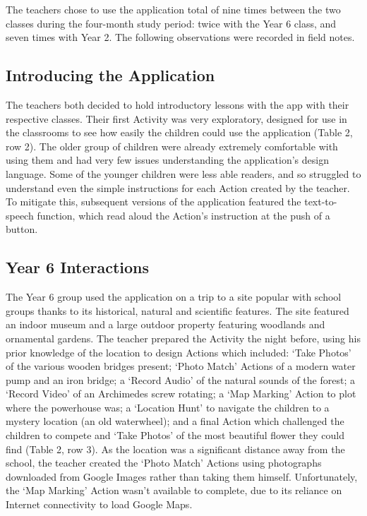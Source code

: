 The teachers chose to use the application total of nine times between the two classes during the four-month study period: twice with the Year 6 class, and seven times with Year 2. The following observations were recorded in field notes.

\subsection{Introducing the Application}

The teachers both decided to hold introductory lessons with the app with their respective classes. Their first Activity was very exploratory, designed for use in the classrooms to see how easily the children could use the application (Table 2, row 2). The older group of children were already extremely comfortable with using them and had very few issues understanding the application’s design language. Some of the younger children were less able readers, and so struggled to understand even the simple instructions for each Action created by the teacher. To mitigate this, subsequent versions of the application featured the text-to-speech function, which read aloud the Action’s instruction at the push of a button.

\subsection{Year 6 Interactions}

The Year 6 group used the application on a trip to a site popular with school groups thanks to its historical, natural and scientific features. The site featured an indoor museum and a large outdoor property featuring woodlands and ornamental gardens. The teacher prepared the Activity the night before, using his prior knowledge of the location to design Actions which included: ‘Take Photos’ of the various wooden bridges present; ‘Photo Match’ Actions of a modern water pump and an iron bridge; a ‘Record Audio’ of the natural sounds of the forest; a ‘Record Video’ of an Archimedes screw rotating; a ‘Map Marking’ Action to plot where the powerhouse was; a ‘Location Hunt’ to navigate the children to a mystery location (an old waterwheel); and a final Action which challenged the children to compete and ‘Take Photos’ of the most beautiful flower they could find (Table 2, row 3). As the location was a significant distance away from the school, the teacher created the ‘Photo Match’ Actions using photographs downloaded from Google Images rather than taking them himself. Unfortunately, the ‘Map Marking’ Action wasn’t available to complete, due to its reliance on Internet connectivity to load Google Maps.

